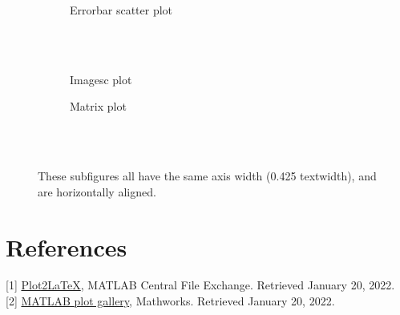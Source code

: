 \documentclass{article}
\begin{document}
\begin{figure}[ht]
\begin{subfigure}{0.425\textwidth}
        \def\svgwidth{1\columnwidth}
        
        \vspace{1ex}
        \caption{Errorbar scatter plot\newline}
    \end{subfigure}\\
    \vspace{4ex}\\
    \begin{subfigure}{0.425\textwidth}
        \def\svgwidth{1\columnwidth}
        
        \vspace{1ex}
        \caption{Imagesc plot}
    \end{subfigure}
    \begin{subfigure}{0.425\textwidth}
        \def\svgwidth{0.0718\columnwidth}
        
        \vspace{7.7ex}
    \end{subfigure}
    \hspace{-0.425\textwidth}
    \hfill
    \begin{subfigure}{0.425\textwidth}
        \def\svgwidth{1\columnwidth}
        
        \vspace{1ex}
        \caption{Matrix plot}
    \end{subfigure}\\
    \vspace{-4ex}\\
    \caption{These subfigures all have the same axis width
    (0.425 textwidth), and are horizontally aligned.}
    \label{fig:subfigures}
\end{figure}

\section{References}
[1] \href{https://www.mathworks.com/matlabcentral/fileexchange/52700-plot2latex}{Plot2LaTeX}, MATLAB Central File Exchange. Retrieved January 20, 2022.
[2] \href{https://uk.mathworks.com/products/matlab/plot-gallery.html}{MATLAB plot gallery}, Mathworks. Retrieved January 20, 2022.
\end{document}
